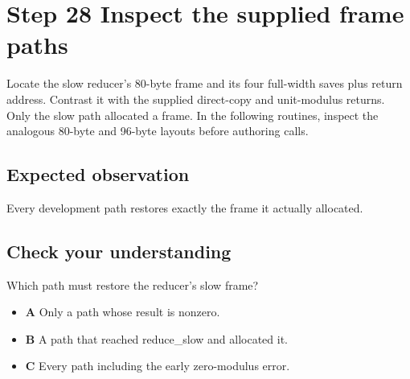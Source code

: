 \section{Step 28 Inspect the supplied frame paths}\label{rsa-s28}

Locate the slow reducer's 80-byte frame and its four full-width saves plus return address. Contrast it with the supplied direct-copy and unit-modulus returns. Only the slow path allocated a frame. In the following routines, inspect the analogous 80-byte and 96-byte layouts before authoring calls.

\subsection{Expected observation}
Every development path restores exactly the frame it actually allocated.

\subsection{Check your understanding}
Which path must restore the reducer's slow frame?

\begin{itemize}
  \item \textbf{A} Only a path whose result is nonzero.
  \item \textbf{B} A path that reached reduce\_slow and allocated it.
  \item \textbf{C} Every path including the early zero-modulus error.
\end{itemize}
